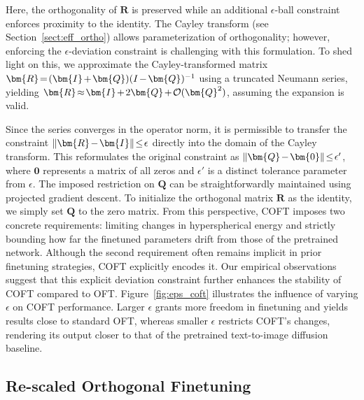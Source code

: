 Here, the orthogonality of $\bm{R}$ is preserved while an additional $\epsilon$-ball constraint enforces proximity to the identity. The Cayley transform (see Section~\ref{sect:eff_ortho}) allows parameterization of orthogonality; however, enforcing the $\epsilon$-deviation constraint is challenging with this formulation. To shed light on this, we approximate the Cayley-transformed matrix $\thickmuskip=2mu \medmuskip=2mu \bm{R}=(\bm{I}+\bm{Q})(I-\bm{Q})^{-1}$ using a truncated Neumann series, yielding $\thickmuskip=2mu \medmuskip=2mu \bm{R}\approx\bm{I}+2\bm{Q}+\mathcal{O}(\bm{Q}^2)$, assuming the expansion is valid.

Since the series converges in the operator norm, it is permissible to transfer the constraint $\thickmuskip=2mu \medmuskip=2mu\|\bm{R}-\bm{I}\|\leq\epsilon$ directly into the domain of the Cayley transform. This reformulates the original constraint as $\thickmuskip=2mu \medmuskip=2mu \|\bm{Q}-\bm{0}\|\leq\epsilon'$, where $\bm{0}$ represents a matrix of all zeros and $\epsilon'$ is a distinct tolerance parameter from $\epsilon$. The imposed restriction on $\bm{Q}$ can be straightforwardly maintained using projected gradient descent. To initialize the orthogonal matrix $\bm{R}$ as the identity, we simply set $\bm{Q}$ to the zero matrix. From this perspective, COFT imposes two concrete requirements: limiting changes in hyperspherical energy and strictly bounding how far the finetuned parameters drift from those of the pretrained network. Although the second requirement often remains implicit in prior finetuning strategies, COFT explicitly encodes it. Our empirical observations suggest that this explicit deviation constraint further enhances the stability of COFT compared to OFT. Figure~\ref{fig:eps_coft} illustrates the influence of varying $\epsilon$ on COFT performance. Larger $\epsilon$ grants more freedom in finetuning and yields results close to standard OFT, whereas smaller $\epsilon$ restricts COFT's changes, rendering its output closer to that of the pretrained text-to-image diffusion baseline.

\subsection{Re-scaled Orthogonal Finetuning}

